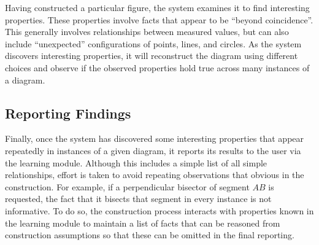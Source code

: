 Having constructed a particular figure, the system examines it to find
interesting properties.  These properties involve facts that appear to
be ``beyond coincidence''.  This generally involves relationships
between measured values, but can also include ``unexpected''
configurations of points, lines, and circles.  As the system discovers
interesting properties, it will reconstruct the diagram using
different choices and observe if the observed properties hold true
across many instances of a diagram.

\subsection{Reporting Findings}

Finally, once the system has discovered some interesting properties
that appear repeatedly in instances of a given diagram, it reports its
results to the user via the learning module.  Although this includes a
simple list of all simple relationships, effort is taken to avoid
repeating observations that obvious in the construction.  For example,
if a perpendicular bisector of segment $AB$ is requested, the fact
that it bisects that segment in every instance is not informative.  To
do so, the construction process interacts with properties known in the
learning module to maintain a list of facts that can be reasoned from
construction assumptions so that these can be omitted in the final
reporting.
